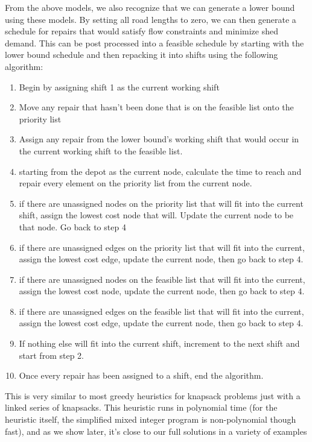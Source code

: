 \documentclass{article}
\begin{document}
	From the above models, we also recognize that we can generate a lower bound using these models. By setting all road lengths to zero, we can then generate a schedule for repairs that would satisfy flow constraints and minimize shed demand. This can be post processed into a feasible schedule by starting with the lower bound schedule and then repacking it into shifts using the following algorithm:
	\begin{enumerate}
		\item Begin by assigning shift 1 as the current working shift
		\item Move any repair that hasn't been done that is on the feasible list onto the priority list
		\item Assign any repair from the lower bound's working shift that would occur in the current working shift to the feasible list.
		\item starting from the depot as the current node, calculate the time to reach and repair every element on the priority list from the current node.
		\item if there are unassigned nodes on the priority list that will fit into the current shift, assign the lowest cost node that will. Update the current node to be that node. Go back to step 4 
		\item if there are unassigned edges on the priority list that will fit into the current, assign the lowest cost edge, update the current node, then go back to step 4.
		\item if there are unassigned nodes on the feasible list that will fit into the current, assign the lowest cost node, update the current node, then go back to step 4.
		\item if there are unassigned edges on the feasible list that will fit into the current, assign the lowest cost edge, update the current node, then go back to step 4.
		\item If nothing else will fit into the current shift, increment to the next shift and start from step 2.
		\item Once every repair has been assigned to a shift, end the algorithm.
	\end{enumerate}
	
	This is very similar to most greedy heuristics for knapsack problems just with a linked series of knapsacks. This heuristic runs in polynomial time (for the heuristic itself, the simplified mixed integer program is non-polynomial though fast), and as we show later, it's close to our full solutions in a variety of examples
	
\end{document}

